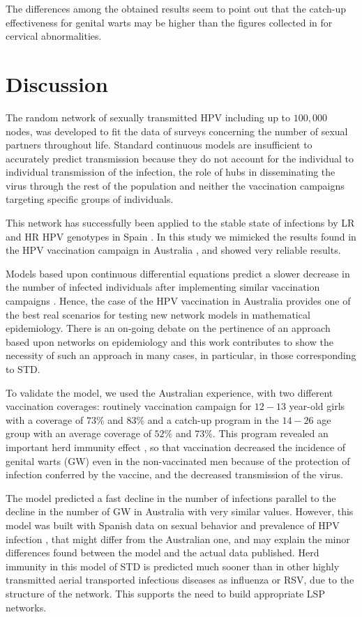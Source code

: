 The differences among the obtained results seem to point out that the catch-up effectiveness for genital warts may be higher than the figures collected in \cite{Skufca} for cervical abnormalities.  

\section{Discussion}
The random network of sexually transmitted HPV including up to $100,000$ nodes, was developed to fit the data of surveys concerning the number of sexual partners throughout life. Standard continuous models are insufficient to accurately predict transmission because they do not account for the individual to individual transmission of the infection, the role of hubs in disseminating the virus through the rest of the population and neither the vaccination campaigns targeting specific groups of individuals.

This network has successfully been applied to the stable state of infections by LR and HR HPV genotypes in Spain  \cite{Acedo2017}. In this study we mimicked the results found in the HPV vaccination campaign in Australia \cite{ali2013genital}, and showed very reliable results. 

Models based upon continuous differential equations predict a slower decrease in the number of infected individuals after implementing similar vaccination campaigns \cite{elbasha2007model}. Hence, the case of the HPV vaccination in Australia provides one of the best real scenarios for testing new network models in mathematical epidemiology. There is an on-going debate on the pertinence of an approach based upon networks on epidemiology \cite{Eubank} and this work contributes to show the necessity of such an approach in many cases, in particular, in those corresponding to STD.

To validate the model, we used the Australian experience, with two different vaccination coverages: routinely vaccination campaign for $12-13$ year-old girls with a coverage of $73\%$ and $83\%$ and a catch-up program in the $14-26$ age group with an average coverage of $52\%$ and $73\%$. This program revealed an important herd immunity effect \cite{ali2013genital}, so that vaccination decreased the incidence of genital warts (GW) even in the non-vaccinated men because of the protection of infection conferred by the vaccine, and the decreased transmission of the virus.

The model predicted a fast decline in the number of infections parallel to the decline in the number of GW in Australia with very similar values. However, this model was built with Spanish data on sexual behavior \cite{INE} and prevalence of HPV infection \cite{castellsague2012prevalence}, that might differ from the Australian one, and may explain the minor differences found between the model and the actual data published. Herd immunity in this model of STD is predicted much sooner than in other highly transmitted aerial transported infectious diseases as influenza or RSV, due to the structure of the network. This supports the need to build appropriate LSP networks. 

